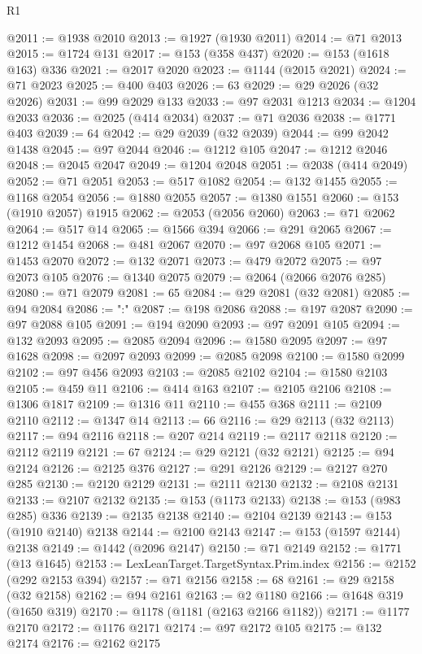 \begin{lexlean}{R1}
\begin{coremodule}
{{{{{{{{{{{{{{{{{{{{{{{{{{{{{{{{{{{{{{{{{{{{{{{{{{{{{{{{{{{{{{{{{{{{{{{{{{{{{{{{{{{{{{{{{{{{{{{{{{{{{{{{{{{{{{{{{{{{{{{{{{{{{{{{{{{{{{{{{{{{{{{{{{{{{{{{{{{{{{{{{{{{{{{{{{{{{{{{{{{{{{{{{{@2011 := @1938 @2010
@2013 := @1927 (@1930 @2011)
@2014 := @71 @2013
@2015 := @1724 @131
@2017 := @153 (@358 @437)
@2020 := @153 (@1618 @163) @336
@2021 := @2017 @2020
@2023 := @1144 (@2015 @2021)
@2024 := @71 @2023
@2025 := @400 @403
@2026 := 63
@2029 := @29 @2026 (@32 @2026)
@2031 := @99 @2029 @133
@2033 := @97 @2031 @1213
@2034 := @1204 @2033
@2036 := @2025 (@414 @2034)
@2037 := @71 @2036
@2038 := @1771 @403
@2039 := 64
@2042 := @29 @2039 (@32 @2039)
@2044 := @99 @2042 @1438
@2045 := @97 @2044
@2046 := @1212 @105
@2047 := @1212 @2046
@2048 := @2045 @2047
@2049 := @1204 @2048
@2051 := @2038 (@414 @2049)
@2052 := @71 @2051
@2053 := @517 @1082
@2054 := @132 @1455
@2055 := @1168 @2054
@2056 := @1880 @2055
@2057 := @1380 @1551
@2060 := @153 (@1910 @2057) @1915
@2062 := @2053 (@2056 @2060)
@2063 := @71 @2062
@2064 := @517 @14
@2065 := @1566 @394
@2066 := @291 @2065
@2067 := @1212 @1454
@2068 := @481 @2067
@2070 := @97 @2068 @105
@2071 := @1453 @2070
@2072 := @132 @2071
@2073 := @479 @2072
@2075 := @97 @2073 @105
@2076 := @1340 @2075
@2079 := @2064 (@2066 @2076 @285)
@2080 := @71 @2079
@2081 := 65
@2084 := @29 @2081 (@32 @2081)
@2085 := @94 @2084
@2086 := ":"
@2087 := @198 @2086
@2088 := @197 @2087
@2090 := @97 @2088 @105
@2091 := @194 @2090
@2093 := @97 @2091 @105
@2094 := @132 @2093
@2095 := @2085 @2094
@2096 := @1580 @2095
@2097 := @97 @1628
@2098 := @2097 @2093
@2099 := @2085 @2098
@2100 := @1580 @2099
@2102 := @97 @456 @2093
@2103 := @2085 @2102
@2104 := @1580 @2103
@2105 := @459 @11
@2106 := @414 @163
@2107 := @2105 @2106
@2108 := @1306 @1817
@2109 := @1316 @11
@2110 := @455 @368
@2111 := @2109 @2110
@2112 := @1347 @14
@2113 := 66
@2116 := @29 @2113 (@32 @2113)
@2117 := @94 @2116
@2118 := @207 @214
@2119 := @2117 @2118
@2120 := @2112 @2119
@2121 := 67
@2124 := @29 @2121 (@32 @2121)
@2125 := @94 @2124
@2126 := @2125 @376
@2127 := @291 @2126
@2129 := @2127 @270 @285
@2130 := @2120 @2129
@2131 := @2111 @2130
@2132 := @2108 @2131
@2133 := @2107 @2132
@2135 := @153 (@1173 @2133)
@2138 := @153 (@983 @285) @336
@2139 := @2135 @2138
@2140 := @2104 @2139
@2143 := @153 (@1910 @2140) @2138
@2144 := @2100 @2143
@2147 := @153 (@1597 @2144) @2138
@2149 := @1442 (@2096 @2147)
@2150 := @71 @2149
@2152 := @1771 (@13 @1645)
@2153 := LexLeanTarget.TargetSyntax.Prim.index
@2156 := @2152 (@292 @2153 @394)
@2157 := @71 @2156
@2158 := 68
@2161 := @29 @2158 (@32 @2158)
@2162 := @94 @2161
@2163 := @2 @1180
@2166 := @1648 @319 (@1650 @319)
@2170 := @1178 (@1181 (@2163 @2166 @1182))
@2171 := @1177 @2170
@2172 := @1176 @2171
@2174 := @97 @2172 @105
@2175 := @132 @2174
@2176 := @2162 @2175
}}}}}}}}}}}}}}}}}}}}}}}}}}}}}}}}}}}}}}}}}}}}}}}}}}}}}}}}}}}}}}}}}}}}}}}}}}}}}}}}}}}}}}}}}}}}}}}}}}}}}}}}}}}}}}}}}}}}}}}}}}}}}}}}}}}}}}}}}}}}}}}}}}}}}}}}}}}}}}}}}}}}}}}}}}}}}}}}}}}}}}}}}}
\end{coremodule}
\end{lexlean}
